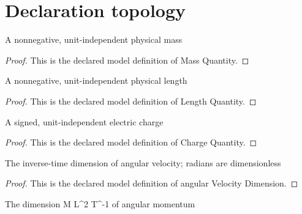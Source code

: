 \section{Declaration topology}
\begin{definition}
  \label{def:physics:phyx-mini-0627:phyxminiproblems-problemphyxmini0627-massquantity}
  A nonnegative, unit-independent physical mass
\end{definition}
\begin{proof}
  This is the declared model definition of Mass Quantity.
\end{proof}
\begin{definition}
  \label{def:physics:phyx-mini-0627:phyxminiproblems-problemphyxmini0627-lengthquantity}
  A nonnegative, unit-independent physical length
\end{definition}
\begin{proof}
  This is the declared model definition of Length Quantity.
\end{proof}
\begin{definition}
  \label{def:physics:phyx-mini-0627:phyxminiproblems-problemphyxmini0627-chargequantity}
  A signed, unit-independent electric charge
\end{definition}
\begin{proof}
  This is the declared model definition of Charge Quantity.
\end{proof}
\begin{definition}
  \label{def:physics:phyx-mini-0627:phyxminiproblems-problemphyxmini0627-angularvelocitydimension}
  The inverse-time dimension of angular velocity; radians are dimensionless
\end{definition}
\begin{proof}
  This is the declared model definition of angular Velocity Dimension.
\end{proof}
\begin{definition}
  \label{def:physics:phyx-mini-0627:phyxminiproblems-problemphyxmini0627-angularmomentumdimension}
  The dimension M L\textasciicircum{}2 T\textasciicircum{}-1 of angular momentum
\end{definition}
